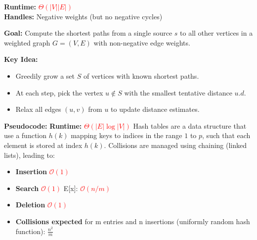 \documentclass[a4paper,landscape]{article}
\newcommand{\timecomplexity}[1]{\textcolor{red}{#1}}
\newcommand{\bigo}{\mathcal{O}}
\begin{document}
\begin{multicols}{7}
\textbf{Runtime:} \timecomplexity{$\Theta(|V||E|)$} \\
\textbf{Handles:} Negative weights (but no negative cycles)
\endtcolorbox

\tcolorbox[mybox={Dijkstra’s Algorithm}]
\textbf{Goal:} Compute the shortest paths from a single source $s$ to all other vertices in a weighted graph $G = (V, E)$ with non-negative edge weights.

\textbf{Key Idea:}
\begin{itemize}[noitemsep, topsep=0pt]
    \item Greedily grow a set $S$ of vertices with known shortest paths.
    \item At each step, pick the vertex $u \notin S$ with the smallest tentative distance $u.d$.
    \item Relax all edges $(u, v)$ from $u$ to update distance estimates.
\end{itemize}
\textbf{Pseudocode:}
\textbf{Runtime:} \timecomplexity{$\Theta(|E| \log |V|)$}
\endtcolorbox
\tcolorbox[mybox={HTable}]
Hash tables are a data structure that use a function $h(k)$ mapping keys to indices in the range $1$ to $p$, such that each element is stored at index $h(k)$.  
Collisions are managed using chaining (linked lists), leading to:
\begin{itemize}
  \item \textbf{Insertion} \timecomplexity{$\bigo(1)$}
  \item \textbf{Search} \timecomplexity{$\bigo(1)$} E[x]: \timecomplexity{$\bigo(n/m)$}
  \item \textbf{Deletion} \timecomplexity{$\bigo(1)$ }
  \item \textbf{Collisions expected} for m entries and n insertions (uniformly random hash function): \(\frac{n^2}{m}\)
\end{itemize}
\endtcolorbox


\end{multicols}
\end{document}
